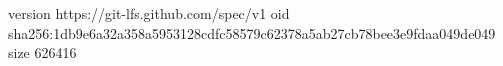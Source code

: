 version https://git-lfs.github.com/spec/v1
oid sha256:1db9e6a32a358a5953128cdfc58579c62378a5ab27cb78bee3e9fdaa049de049
size 626416

